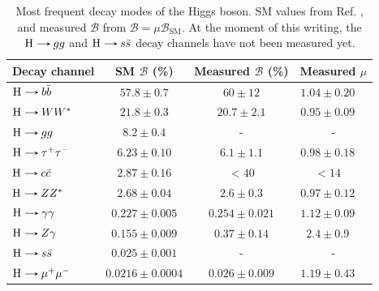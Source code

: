 \begin{table}[!ht]
    \centering
    \begin{tabular}{|l|c|c|cc|}
        \hline
        \multicolumn{1}{|c|}{\cellcolor{lightgray}Decay channel} & \cellcolor{lightgray} SM $\mathcal{B}$ (\%) & \cellcolor{lightgray} Measured $\mathcal{B}$ (\%) & \multicolumn{2}{c|}{\cellcolor{lightgray} Measured $\mu$} \\ \hline
        $\text{H}\decaysto b\bar{b}$     & $57.8 \pm 0.7$        & $60 \pm 12$         & $1.04 \pm 0.20$ & \cite{CMS:2018nsn}  \\
        $\text{H}\decaysto WW^*$         & $21.8 \pm 0.3$        & $20.7 \pm 2.1$      & $0.95 \pm 0.09$ & \cite{CMS:2022uhn}  \\
        $\text{H}\decaysto gg$           & $8.2 \pm 0.4$         & -                   & \multicolumn{2}{c|}{-}                \\
        $\text{H}\decaysto \tau^+\tau^-$ & $6.23 \pm 0.10$       & $6.1 \pm 1.1$       & $0.98 \pm 0.18$ & \cite{CMS:2017zyp}  \\
        $\text{H}\decaysto c\bar{c}$     & $2.87 \pm 0.16$       & $<40$               & $<14$ & \cite{CMS:2022psv}            \\
        $\text{H}\decaysto ZZ^*$         & $2.68 \pm 0.04$       & $2.6 \pm 0.3$       & $0.97 \pm 0.12$ & \cite{CMS:2022dwd}  \\
        $\text{H}\decaysto \gamma\gamma$ & $0.227 \pm 0.005$     & $0.254 \pm 0.021$   & $1.12 \pm 0.09$ & \cite{CMS:2021kom}  \\
        $\text{H}\decaysto Z\gamma$      & $0.155 \pm 0.009$     & $0.37 \pm 0.14$     & $2.4 \pm 0.9$ & \cite{CMS:2022ahq}    \\
        $\text{H}\decaysto s\bar{s}$     & $0.025 \pm 0.001$     & -                   & \multicolumn{2}{c|}{-}                \\
        $\text{H}\decaysto \mu^+\mu^-$   & $0.0216 \pm 0.0004$   & $0.026 \pm 0.009$   & $1.19 \pm 0.43$ & \cite{CMS:2020xwi}  \\ \hline
    \end{tabular}
    \caption{Most frequent decay modes of the Higgs boson. SM values from Ref. \cite{LHCHiggsCrossSectionWorkingGroup:2016ypw, CMS:2022dwd}, and measured $\mathcal{B}$ from $\mathcal{B}=\mu\mathcal{B}_{\text{SM}}$. At the moment of this writing, the $\text{H}\protect\decaysto gg$ and $\text{H}\protect\decaysto s\bar{s}$ decay channels have not been measured yet.}
    \label{tab:Higgs_decays}
\end{table}

